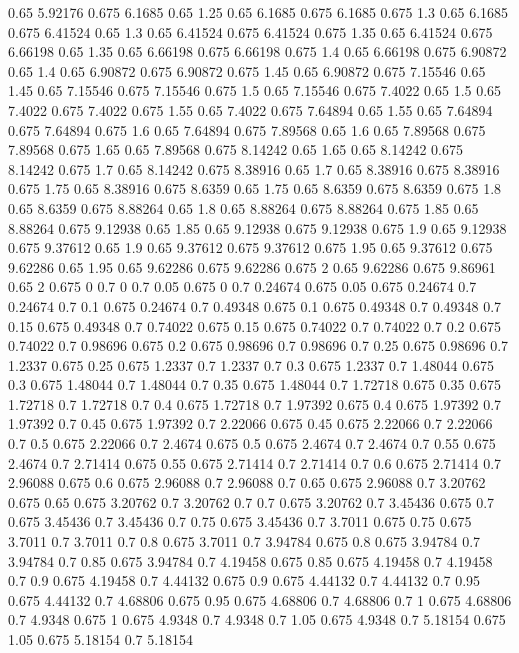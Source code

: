 0.65 5.92176
0.675 6.1685
0.65 1.25
0.65 6.1685
0.675 6.1685
0.675 1.3
0.65 6.1685
0.675 6.41524
0.65 1.3
0.65 6.41524
0.675 6.41524
0.675 1.35
0.65 6.41524
0.675 6.66198
0.65 1.35
0.65 6.66198
0.675 6.66198
0.675 1.4
0.65 6.66198
0.675 6.90872
0.65 1.4
0.65 6.90872
0.675 6.90872
0.675 1.45
0.65 6.90872
0.675 7.15546
0.65 1.45
0.65 7.15546
0.675 7.15546
0.675 1.5
0.65 7.15546
0.675 7.4022
0.65 1.5
0.65 7.4022
0.675 7.4022
0.675 1.55
0.65 7.4022
0.675 7.64894
0.65 1.55
0.65 7.64894
0.675 7.64894
0.675 1.6
0.65 7.64894
0.675 7.89568
0.65 1.6
0.65 7.89568
0.675 7.89568
0.675 1.65
0.65 7.89568
0.675 8.14242
0.65 1.65
0.65 8.14242
0.675 8.14242
0.675 1.7
0.65 8.14242
0.675 8.38916
0.65 1.7
0.65 8.38916
0.675 8.38916
0.675 1.75
0.65 8.38916
0.675 8.6359
0.65 1.75
0.65 8.6359
0.675 8.6359
0.675 1.8
0.65 8.6359
0.675 8.88264
0.65 1.8
0.65 8.88264
0.675 8.88264
0.675 1.85
0.65 8.88264
0.675 9.12938
0.65 1.85
0.65 9.12938
0.675 9.12938
0.675 1.9
0.65 9.12938
0.675 9.37612
0.65 1.9
0.65 9.37612
0.675 9.37612
0.675 1.95
0.65 9.37612
0.675 9.62286
0.65 1.95
0.65 9.62286
0.675 9.62286
0.675 2
0.65 9.62286
0.675 9.86961
0.65 2
0.675 0
0.7 0
0.7 0.05
0.675 0
0.7 0.24674
0.675 0.05
0.675 0.24674
0.7 0.24674
0.7 0.1
0.675 0.24674
0.7 0.49348
0.675 0.1
0.675 0.49348
0.7 0.49348
0.7 0.15
0.675 0.49348
0.7 0.74022
0.675 0.15
0.675 0.74022
0.7 0.74022
0.7 0.2
0.675 0.74022
0.7 0.98696
0.675 0.2
0.675 0.98696
0.7 0.98696
0.7 0.25
0.675 0.98696
0.7 1.2337
0.675 0.25
0.675 1.2337
0.7 1.2337
0.7 0.3
0.675 1.2337
0.7 1.48044
0.675 0.3
0.675 1.48044
0.7 1.48044
0.7 0.35
0.675 1.48044
0.7 1.72718
0.675 0.35
0.675 1.72718
0.7 1.72718
0.7 0.4
0.675 1.72718
0.7 1.97392
0.675 0.4
0.675 1.97392
0.7 1.97392
0.7 0.45
0.675 1.97392
0.7 2.22066
0.675 0.45
0.675 2.22066
0.7 2.22066
0.7 0.5
0.675 2.22066
0.7 2.4674
0.675 0.5
0.675 2.4674
0.7 2.4674
0.7 0.55
0.675 2.4674
0.7 2.71414
0.675 0.55
0.675 2.71414
0.7 2.71414
0.7 0.6
0.675 2.71414
0.7 2.96088
0.675 0.6
0.675 2.96088
0.7 2.96088
0.7 0.65
0.675 2.96088
0.7 3.20762
0.675 0.65
0.675 3.20762
0.7 3.20762
0.7 0.7
0.675 3.20762
0.7 3.45436
0.675 0.7
0.675 3.45436
0.7 3.45436
0.7 0.75
0.675 3.45436
0.7 3.7011
0.675 0.75
0.675 3.7011
0.7 3.7011
0.7 0.8
0.675 3.7011
0.7 3.94784
0.675 0.8
0.675 3.94784
0.7 3.94784
0.7 0.85
0.675 3.94784
0.7 4.19458
0.675 0.85
0.675 4.19458
0.7 4.19458
0.7 0.9
0.675 4.19458
0.7 4.44132
0.675 0.9
0.675 4.44132
0.7 4.44132
0.7 0.95
0.675 4.44132
0.7 4.68806
0.675 0.95
0.675 4.68806
0.7 4.68806
0.7 1
0.675 4.68806
0.7 4.9348
0.675 1
0.675 4.9348
0.7 4.9348
0.7 1.05
0.675 4.9348
0.7 5.18154
0.675 1.05
0.675 5.18154
0.7 5.18154
